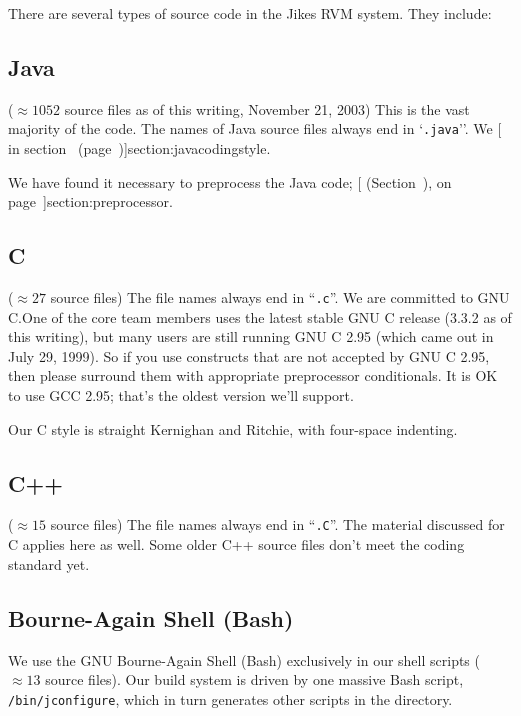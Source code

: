 There are several types of source code in the Jikes RVM system.  They
include:


\subsection{Java} 
($\approx 1052$ source files as of this writing, November 21, 2003)  This is
the vast majority of the code.  The names of Java source files always end in
`{\tt .java}''.   We [ in
section~\Ref{} (page~\Pageref)]{section:javacodingstyle}. 

We have found it necessary to preprocess the Java code; [ 
  (Section~\Ref), on page~\Pageref]{section:preprocessor}.


\subsection{C}

($\approx 27$ source files)  The file names always
end in ``{\tt .c}''.  We are committed to GNU C.\@  One of the core team
members uses the latest stable GNU C release (3.3.2 as of this writing), but many users
are still running GNU C 2.95 (which came out in July 29, 1999).  So if
you use constructs that are not accepted by GNU C 2.95, then please surround them with
appropriate preprocessor conditionals.  It is OK to use GCC 2.95;
that's the oldest version we'll support.

Our C style is straight Kernighan and Ritchie, with four-space
indenting.  

\subsection{C++} 

($\approx 15$ source files)  The file names always end in
``{\tt .C}''.   The material discussed for C applies here as well.
Some older C++ source files don't meet the coding standard yet.

\subsection{Bourne-Again Shell (Bash)}

We use the GNU Bourne-Again Shell (Bash) exclusively in our shell
scripts ($\approx 13$ source files).  Our build system is driven by
one massive Bash script, {\tt /bin/jconfigure}, which in turn
generates other scripts in the  directory.


